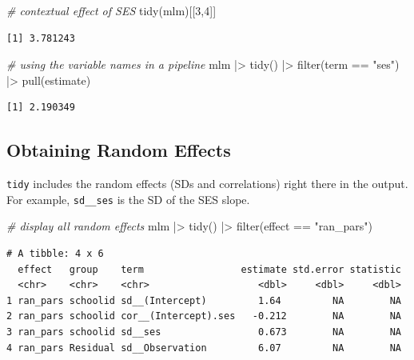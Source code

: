 \documentclass[
  letterpaper,
  DIV=11,
  numbers=noendperiod]{scrreprt}
\newenvironment{Shaded}{}{}
\newcommand{\CommentTok}[1]{\textcolor[rgb]{0.38,0.63,0.69}{\textit{#1}}}
\newcommand{\DecValTok}[1]{\textcolor[rgb]{0.25,0.63,0.44}{#1}}
\newcommand{\FunctionTok}[1]{\textcolor[rgb]{0.02,0.16,0.49}{#1}}
\newcommand{\NormalTok}[1]{#1}
\newcommand{\SpecialCharTok}[1]{\textcolor[rgb]{0.25,0.44,0.63}{#1}}
\newcommand{\StringTok}[1]{\textcolor[rgb]{0.25,0.44,0.63}{#1}}
\begin{document}
\begin{Shaded}
\begin{Highlighting}[]
\CommentTok{\# contextual effect of SES}
\FunctionTok{tidy}\NormalTok{(mlm)[[}\DecValTok{3}\NormalTok{,}\DecValTok{4}\NormalTok{]]}
\end{Highlighting}
\end{Shaded}

\begin{verbatim}
[1] 3.781243
\end{verbatim}

\begin{Shaded}
\begin{Highlighting}[]
\CommentTok{\# using the variable names in a pipeline}
\NormalTok{mlm }\SpecialCharTok{|\textgreater{}} 
  \FunctionTok{tidy}\NormalTok{() }\SpecialCharTok{|\textgreater{}} 
  \FunctionTok{filter}\NormalTok{(term }\SpecialCharTok{==} \StringTok{"ses"}\NormalTok{) }\SpecialCharTok{|\textgreater{}} 
  \FunctionTok{pull}\NormalTok{(estimate)}
\end{Highlighting}
\end{Shaded}

\begin{verbatim}
[1] 2.190349
\end{verbatim}

\subsection{Obtaining Random Effects}\label{obtaining-random-effects}

\texttt{tidy} includes the random effects (SDs and correlations) right
there in the output. For example, \texttt{sd\_\_ses} is the SD of the
SES slope.

\begin{Shaded}
\begin{Highlighting}[]
\CommentTok{\# display all random effects}
\NormalTok{mlm }\SpecialCharTok{|\textgreater{}} 
  \FunctionTok{tidy}\NormalTok{() }\SpecialCharTok{|\textgreater{}} 
  \FunctionTok{filter}\NormalTok{(effect }\SpecialCharTok{==} \StringTok{"ran\_pars"}\NormalTok{)}
\end{Highlighting}
\end{Shaded}

\begin{verbatim}
# A tibble: 4 x 6
  effect   group    term                 estimate std.error statistic
  <chr>    <chr>    <chr>                   <dbl>     <dbl>     <dbl>
1 ran_pars schoolid sd__(Intercept)         1.64         NA        NA
2 ran_pars schoolid cor__(Intercept).ses   -0.212        NA        NA
3 ran_pars schoolid sd__ses                 0.673        NA        NA
4 ran_pars Residual sd__Observation         6.07         NA        NA
\end{verbatim}
\end{document}
